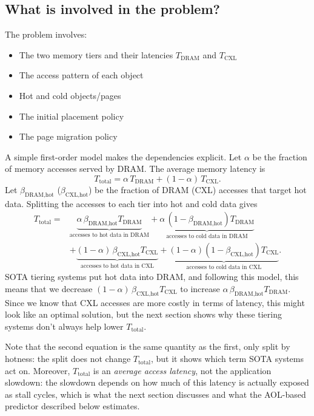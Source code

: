 \documentclass[conference]{IEEEtran}
\begin{document}
\subsection{What is involved in the problem?}
The problem involves:
\begin{itemize}
    \item The two memory tiers and their latencies $T_{\text{DRAM}}$ and $T_{\text{CXL}}$
    \item The access pattern of each object
    \item Hot and cold objects/pages
    \item The initial placement policy
    \item The page migration policy
\end{itemize} 
 
A simple first-order model makes the dependencies explicit. Let $\alpha$ be the
fraction of memory accesses served by DRAM. The average memory latency is
\begin{equation}
T_{\text{total}} = \alpha\,T_{\text{DRAM}} + (1-\alpha)\,T_{\text{CXL}}.
\end{equation}
Let $\beta_{\text{DRAM,hot}}$ ($\beta_{\text{CXL,hot}}$) be the fraction of
DRAM (CXL) accesses that target hot data. Splitting the accesses to each tier
into hot and cold data gives
\begin{align}
T_{\text{total}} ={}& \underbrace{\alpha\,\beta_{\text{DRAM,hot}}T_{\text{DRAM}}}_{\text{accesses to hot data in DRAM}}
 + \underbrace{\alpha\,(1-\beta_{\text{DRAM,hot}})T_{\text{DRAM}}}_{\text{accesses to cold data in DRAM}} \nonumber\\
 &+ \underbrace{(1-\alpha)\,\beta_{\text{CXL,hot}}T_{\text{CXL}}}_{\text{accesses to hot data in CXL}}
 + \underbrace{(1-\alpha)(1-\beta_{\text{CXL,hot}})T_{\text{CXL}}}_{\text{accesses to cold data in CXL}}.
\end{align}
SOTA tiering systems put hot data into DRAM, and following this model, this means that we decrease $(1-\alpha)\,\beta_{\text{CXL,hot}}T_{\text{CXL}}$ to increase $\alpha\,\beta_{\text{DRAM,hot}}T_{\text{DRAM}}$.
Since we know that CXL accesses are more costly in terms of latency, this might look like an optimal solution, but the next section shows why these tiering systems don't always help lower $T_{\text{total}}$.

Note that the second equation is the same quantity as the first, only split by
hotness: the split does not change $T_{\text{total}}$, but it shows which term
SOTA systems act on. Moreover, $T_{\text{total}}$ is an \emph{average access
latency}, not the application slowdown: the slowdown depends on how much of
this latency is actually exposed as stall cycles, which is what the next
section discusses and what the AOL-based predictor described below estimates.
\end{document}
